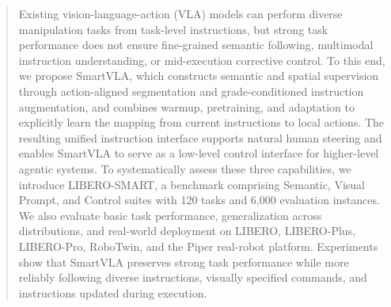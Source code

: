 \begin{abstract}
Existing vision-language-action (VLA) models can perform diverse manipulation tasks from task-level
instructions, but strong task performance does not ensure fine-grained semantic following,
multimodal instruction understanding, or mid-execution corrective control. To this end, we propose
SmartVLA, which constructs semantic and spatial supervision through action-aligned segmentation and
grade-conditioned instruction augmentation, and combines warmup, pretraining, and adaptation to
explicitly learn the mapping from current instructions to local actions. The resulting unified
instruction interface supports natural human steering and enables SmartVLA to serve as a low-level
control interface for higher-level agentic systems. To systematically assess these three
capabilities, we introduce LIBERO-SMART, a benchmark comprising Semantic, Visual Prompt, and Control
suites with 120 tasks and 6,000 evaluation instances. We also evaluate basic task performance,
generalization across distributions, and real-world deployment on LIBERO, LIBERO-Plus, LIBERO-Pro,
RoboTwin, and the Piper real-robot platform. Experiments show that SmartVLA preserves strong task
performance while more reliably following diverse instructions, visually specified commands, and
instructions updated during execution.
\end{abstract}

